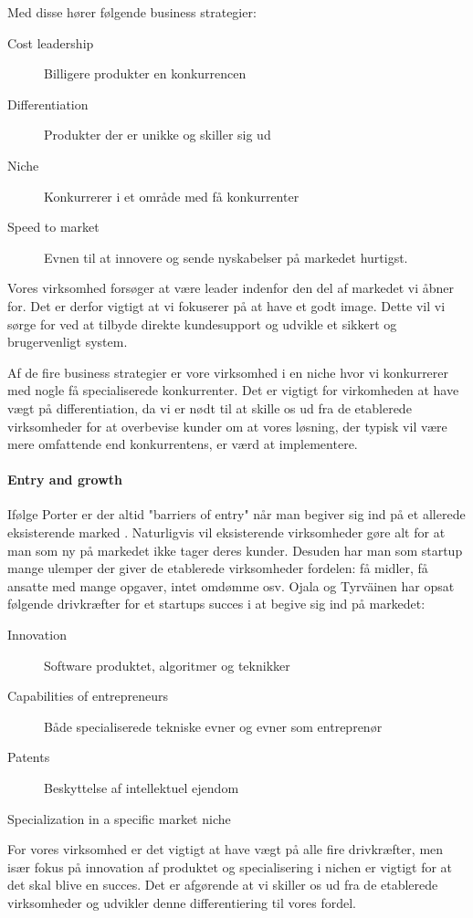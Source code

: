 Med disse hører følgende business strategier:
\begin{description}
	\item[Cost leadership] Billigere produkter en konkurrencen
	\item [Differentiation] Produkter der er unikke og skiller sig ud
	\item [Niche] Konkurrerer i et område med få konkurrenter
	\item [Speed to market] Evnen til at innovere og sende nyskabelser på markedet hurtigst.
\end{description}

Vores virksomhed forsøger at være leader indenfor den del af markedet vi åbner for.
Det er derfor vigtigt at vi fokuserer på at have et godt image.
Dette vil vi sørge for ved at tilbyde direkte kundesupport og udvikle et sikkert og brugervenligt system.

Af de fire business strategier er vore virksomhed i en niche hvor vi konkurrerer med nogle få specialiserede konkurrenter.
Det er vigtigt for virkomheden at have vægt på differentiation, da vi er nødt til at skille os ud fra de etablerede virksomheder for at overbevise kunder om at vores løsning, der typisk vil være mere omfattende end konkurrentens, er værd at implementere.

\paragraph{Entry and growth}
Ifølge Porter er der altid "barriers of entry" når man begiver sig ind på et allerede eksisterende marked \citep[p.~50]{rose2012software}.
Naturligvis vil eksisterende virksomheder gøre alt for at man som ny på markedet ikke tager deres kunder.
Desuden har man som startup mange ulemper der giver de etablerede virksomheder fordelen: få midler, få ansatte med mange opgaver, intet omdømme osv.
Ojala og Tyrväinen har opsat følgende drivkræfter for et startups succes i at begive sig ind på markedet: \citep[p.~50]{rose2012software}

\begin{description}
	\item[Innovation] Software produktet, algoritmer og teknikker
	\item [Capabilities of entrepreneurs] Både specialiserede tekniske evner og evner som entreprenør
	\item [Patents] Beskyttelse af intellektuel ejendom
	\item [Specialization in a specific market niche] 
\end{description}

For vores virksomhed er det vigtigt at have vægt på alle fire drivkræfter, men især fokus på innovation af produktet og specialisering i nichen er vigtigt for at det skal blive en succes.
Det er afgørende at vi skiller os ud fra de etablerede virksomheder og udvikler denne differentiering til vores fordel.